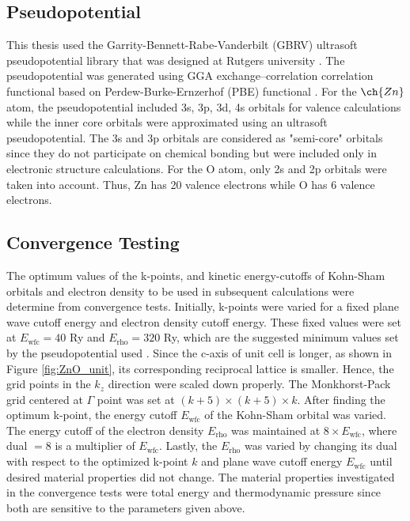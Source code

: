     \subsection{Pseudopotential}
    This thesis used the Garrity-Bennett-Rabe-Vanderbilt (GBRV) ultrasoft pseudopotential library that was designed at Rutgers university \citep{Garrity2014}. The pseudopotential was generated using GGA exchange–correlation correlation functional based on Perdew-Burke-Ernzerhof (PBE) functional \citep{Perdew1996}. For the $\ch{Zn}$ atom, the pseudopotential included 3s, 3p, 3d, 4s orbitals for valence calculations  while the inner core orbitals were approximated using an ultrasoft pseudopotential. The 3s and 3p orbitals are considered as "semi-core" orbitals since they do not participate on chemical bonding but were included only in electronic structure calculations. For the O atom, only  2s and 2p orbitals were taken into account. Thus, Zn has 20 valence electrons while O has 6 valence electrons. 

    \subsection{Convergence Testing}
    The optimum values of the k-points, and kinetic energy-cutoffs  of  Kohn-Sham orbitals and electron density to be used in subsequent calculations were determine from convergence tests. Initially, k-points were varied for a fixed plane wave cutoff energy and electron density cutoff energy. These fixed values were set at $E_{\text{wfc}} = 40$ Ry and $E_{\text{rho}} = 320$ Ry, which are the suggested minimum values set by the pseudopotential used \citep{Garrity2014}.  Since the c-axis of  unit cell is longer, as shown in Figure \ref{fig:ZnO_unit}, its corresponding reciprocal lattice is smaller. Hence, the grid points in the $k_z$ direction were scaled down properly. The Monkhorst-Pack grid centered at $\Gamma$ point was set at $(k+5) \times (k +5 ) \times k$. After finding the optimum k-point, the energy cutoff $E_{\text{wfc}}$ of the Kohn-Sham orbital was varied. The energy cutoff of the electron density $E_{\text{rho}}$ was maintained at $8 \times E_{\text{wfc}}$, where dual $=8$ is a multiplier of $E_{\text{wfc}}$. Lastly, the $E_{\text{rho}}$ was varied by changing its dual with respect to the optimized k-point $k$ and plane wave cutoff energy $E_{\text{wfc}}$ until desired material properties did not change. The material properties investigated in the convergence tests were total energy and thermodynamic pressure since both are sensitive to the parameters given above. 

